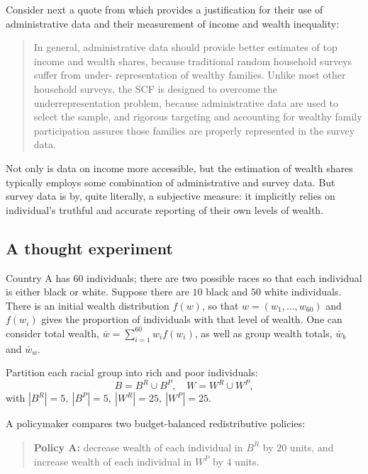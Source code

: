 \documentclass[Chp3.tex]{subfiles}
\begin{document}
\par Consider next a quote from \cite{bks16} which provides a justification for their use of administrative data and their measurement of income and wealth inequality:

\begin{quote}

In general, administrative data should provide better estimates of top income and wealth shares, because traditional random household surveys suffer from under- representation of wealthy families. Unlike most other household surveys, the SCF is designed to overcome the underrepresentation problem, because administrative data are used to select the sample, and rigorous targeting and accounting for wealthy family participation assures those families are properly represented in the survey data.

\end{quote}

\par Not only is  data on income more accessible, but the estimation of wealth shares typically employs some combination of administrative and survey data. But survey data is by, quite literally, a subjective measure: it implicitly relies on individual's truthful and accurate reporting of their own levels of wealth.

\subsection{A thought experiment}

\par Country A has $60$ individuals; there are two possible races so that each individual is either black or white. Suppose there are $10$ black and $50$ white individuals. There is an initial wealth distribution $f(w)$, so that $w=(w_1,\ldots,w_{60})$ and $f(w_i)$ gives the proportion of individuals with that level of wealth. One can consider total wealth, $\bar{w}=\sum_{i=1}^{60} w_i f(w_i)$, as well as group wealth totals, $\bar{w}_b$ and $\bar{w}_w$.

\par Partition each racial group into rich and poor individuals:
\[
B=B^R\cup B^P,\quad W=W^R\cup W^P,
\]
with $|B^R|=5,\ |B^P|=5,\ |W^R|=25,\ |W^P|=25$.

\par A policymaker compares two budget-balanced redistributive policies:

\begin{quote}
\textbf{Policy A:} decrease wealth of each individual in $B^R$ by $20$ units, and increase wealth of each individual in $W^P$ by $4$ units.
\end{quote}
\end{document}
